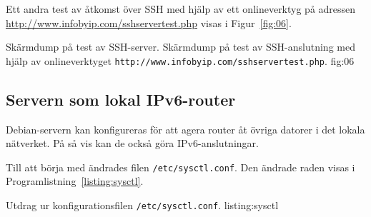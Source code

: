 Ett andra test av åtkomst över SSH med hjälp av ett onlineverktyg på adressen
\url{http://www.infobyip.com/sshservertest.php} \cite{ipv6:sshservertest}
visas i Figur~\ref{fig:06}.

           {Skärmdump på test av SSH-server.}
					 {Skärmdump på test av SSH-anslutning med hjälp av onlineverktyget 
				    \texttt{http://www.infobyip.com/sshservertest.php}.}
           {fig:06}


\subsection{Servern som lokal IPv6-router}
Debian-servern kan konfigureras för att agera router åt övriga datorer i det
lokala nätverket. På så vis kan de också göra IPv6-anslutningar.

Till att börja med ändrades filen \texttt{/etc/sysctl.conf}. Den ändrade
raden visas i Programlistning~\ref{listing:sysctl}.

             {Utdrag ur konfigurationsfilen \texttt{/etc/sysctl.conf}.}
             {listing:sysctl}
